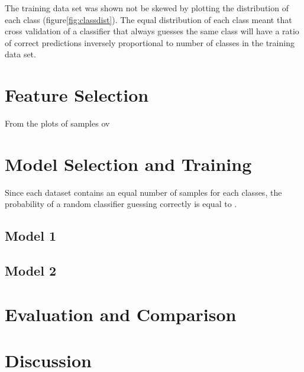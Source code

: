 \documentclass[12pt]{article}
\begin{document}
The training data set was shown not be skewed by plotting the distribution of each class (figure\ref{fig:classdist}). The equal distribution of each class meant that cross validation of a classifier that always guesses the same class will have a ratio of correct predictions inversely proportional to number of classes in the training data set. 

\section{Feature Selection}

From the plots of samples ov

\section{Model Selection and Training}

Since each dataset contains an equal number of samples for each classes, the probability of a random classifier guessing correctly is equal to . 

\subsection{Model 1}
\subsection{Model 2}
\section{Evaluation and Comparison}
\section{Discussion}



\end{document}
